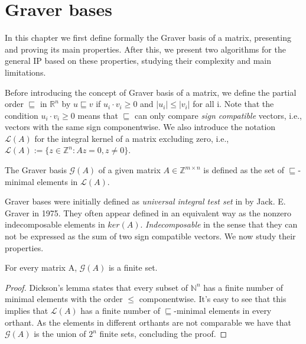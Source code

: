 \chapter{Graver bases} \label{2.Graver_bases}

In this chapter we first define formally the Graver basis of a matrix, presenting and proving its main properties. After this, we present two algorithms for the general IP based on these properties, studying their complexity and main limitations. 

Before introducing the concept of Graver basis of a matrix, we define the partial order $\sqsubseteq$ in $\mathbb{R}^n$ by $u \sqsubseteq v$ if $u_i \cdot v_i \geq 0$ and $|u_i| \leq |v_i|$ for all i. Note that the condition $u_i \cdot v_i \geq 0$ means that $\sqsubseteq$ can only compare \textit{sign compatible} vectors, i.e., vectors with the same sign componentwise. We also introduce the notation $\mathcal{L}(A)$ for the integral kernel of a matrix excluding zero, i.e., $\mathcal{L}(A) := \{z \in \mathbb{Z}^n: Az = 0, z\neq0\}$.

\begin{definition}
The Graver basis $\mathcal{G}(A)$ of a given matrix $A \in \mathbb{Z}^{m \times n}$ is defined as the set of $\sqsubseteq$-minimal elements in $\mathcal{L}(A)$.
\end{definition}

\vspace{-5pt}
Graver bases were initially defined as \textit{universal integral test set} in \cite{GRAVER:1975} by Jack. E. Graver in 1975. They often appear defined in an equivalent way as the nonzero indecomposable elements in $ker(A)$. \emph{Indecomposable} in the sense that they can not be expressed as the sum of two sign compatible vectors. We now study their properties.

\begin{proposition}\label{GB_finite}
For every matrix A, $\mathcal{G}(A)$ is a finite set.
\end{proposition}
\vspace{-20pt}
\begin{proof}
Dickson's lemma states that every subset of $\mathbb{N}^n$ has a finite number of minimal elements with the order $\leq$ componentwise. It's easy to see that this implies that $\mathcal{L}(A)$ has a finite number of $\sqsubseteq$-minimal elements in every orthant. As the elements in different orthants are not comparable we have that $\mathcal{G}(A)$ is the union of $2^n$ finite sets, concluding the proof.
\end{proof}

